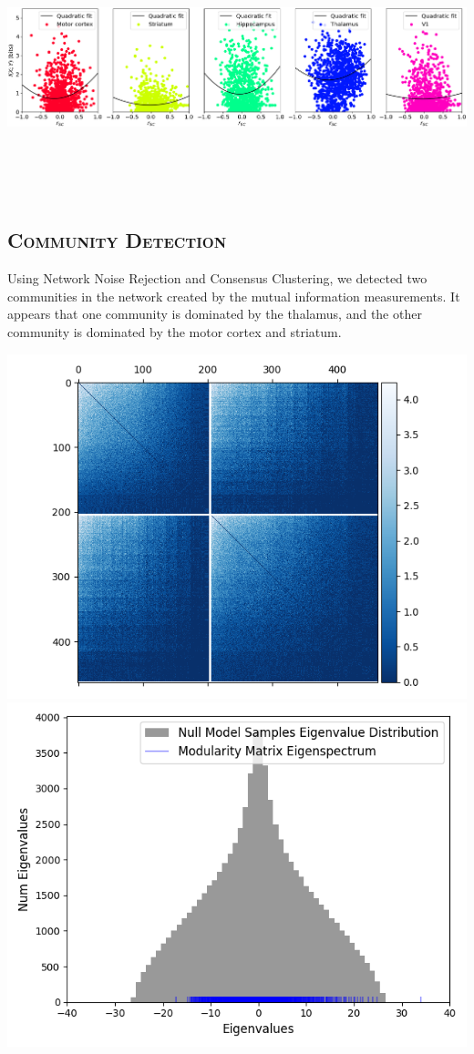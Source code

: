 \documentclass[a0,portrait]{a0poster}
\begin{document}
\begin{multicols}{2}
\includegraphics[width=\linewidth, height=7.5cm]{info_vs_corr.png}

\subsection*{\color{NavyBlue}\textsc{Community Detection}\color{Black}}

Using Network Noise Rejection and Consensus Clustering, we detected two communities in the network created by the mutual information measurements. It appears that one community is dominated by the thalamus, and the other community is dominated by the motor cortex and striatum.

\includegraphics[width=0.5\linewidth]{cons_cluster_map_all_good_15.png}
\includegraphics[width=0.5\linewidth]{eig_hist_all_good_15.png}



\end{multicols}
\end{document}
